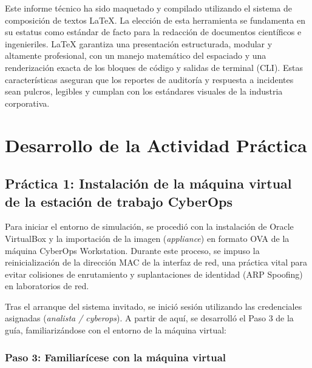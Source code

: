 \documentclass[12pt,a4paper]{article}
\begin{document}
Este informe técnico ha sido maquetado y compilado utilizando el sistema de composición de textos \LaTeX. La elección de esta herramienta se fundamenta en su estatus como estándar de facto para la redacción de documentos científicos e ingenieriles. \LaTeX{} garantiza una presentación estructurada, modular y altamente profesional, con un manejo matemático del espaciado y una renderización exacta de los bloques de código y salidas de terminal (CLI). Estas características aseguran que los reportes de auditoría y respuesta a incidentes sean pulcros, legibles y cumplan con los estándares visuales de la industria corporativa.

\section{Desarrollo de la Actividad Práctica}

\subsection{Práctica 1: Instalación de la máquina virtual de la estación de trabajo CyberOps}

Para iniciar el entorno de simulación, se procedió con la instalación de Oracle VirtualBox y la importación de la imagen (\textit{appliance}) en formato OVA de la máquina CyberOps Workstation. Durante este proceso, se impuso la reinicialización de la dirección MAC de la interfaz de red, una práctica vital para evitar colisiones de enrutamiento y suplantaciones de identidad (ARP Spoofing) en laboratorios de red.

Tras el arranque del sistema invitado, se inició sesión utilizando las credenciales asignadas (\textit{analista / cyberops}). A partir de aquí, se desarrolló el Paso 3 de la guía, familiarizándose con el entorno de la máquina virtual:

\subsubsection*{Paso 3: Familiarícese con la máquina virtual}
\end{document}
